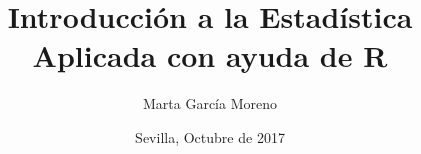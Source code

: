 % 
% 
% 
% 
% 

\title{Introducción a la Estadística Aplicada con ayuda de R}
\author{Marta García Moreno}
\date{Sevilla, Octubre de 2017}
\newcommand*\titulacion{Grado en Estadística}
\newcommand*\proyecto{Trabajo Fin de Máster}
\newcommand*\Logo{logo}


\maketitle

\thispagestyle{empty}
\cleardoublepage

\raggedbottom


%